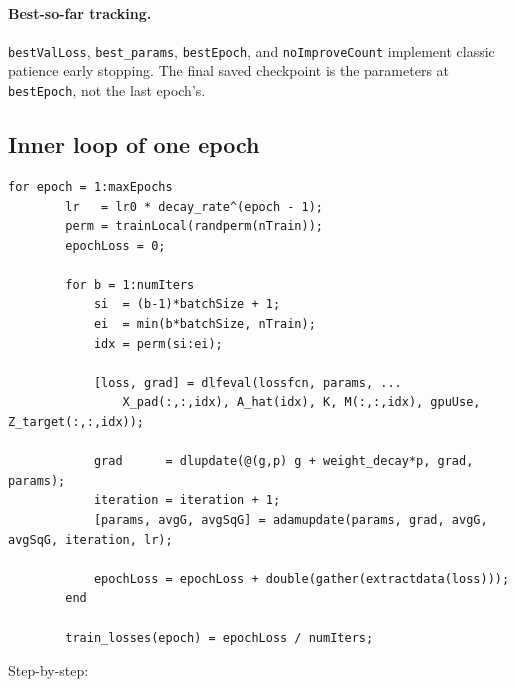 \documentclass[11pt]{article}
\begin{document}
\paragraph{Best-so-far tracking.} \texttt{bestValLoss}, \texttt{best\_params},
\texttt{bestEpoch}, and \texttt{noImproveCount} implement classic patience
early stopping. The final saved checkpoint is the parameters at
\texttt{bestEpoch}, not the last epoch's.

\subsection{Inner loop of one epoch}

\begin{lstlisting}[caption={Per-iteration training step}]
    for epoch = 1:maxEpochs
        lr   = lr0 * decay_rate^(epoch - 1);
        perm = trainLocal(randperm(nTrain));
        epochLoss = 0;

        for b = 1:numIters
            si  = (b-1)*batchSize + 1;
            ei  = min(b*batchSize, nTrain);
            idx = perm(si:ei);

            [loss, grad] = dlfeval(lossfcn, params, ...
                X_pad(:,:,idx), A_hat(idx), K, M(:,:,idx), gpuUse, Z_target(:,:,idx));

            grad      = dlupdate(@(g,p) g + weight_decay*p, grad, params);
            iteration = iteration + 1;
            [params, avgG, avgSqG] = adamupdate(params, grad, avgG, avgSqG, iteration, lr);

            epochLoss = epochLoss + double(gather(extractdata(loss)));
        end

        train_losses(epoch) = epochLoss / numIters;
\end{lstlisting}

Step-by-step:
\end{document}
